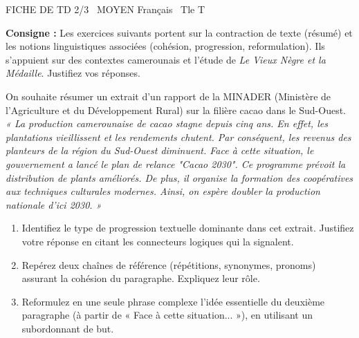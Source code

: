 \documentclass[11pt]{article}
\begin{document}
\begin{tcolorbox}[enhanced,colback=popink,colframe=popink,arc=10pt,boxrule=0pt,left=12pt,right=12pt,top=9pt,bottom=9pt]
{\color{white}\popxbold\small FICHE DE TD 2/3 \textbullet\ MOYEN \hfill Français \textbullet\ Tle T\par}
\end{tcolorbox}
\vspace{4pt}
\noindent\textbf{Consigne :} Les exercices suivants portent sur la contraction de texte (résumé) et les notions linguistiques associées (cohésion, progression, reformulation). Ils s'appuient sur des contextes camerounais et l'étude de \textit{Le Vieux Nègre et la Médaille}. Justifiez vos réponses.

\begin{exercice}
On souhaite résumer un extrait d'un rapport de la MINADER (Ministère de l'Agriculture et du Développement Rural) sur la filière cacao dans le Sud-Ouest.
\textit{« La production camerounaise de cacao stagne depuis cinq ans. En effet, les plantations vieillissent et les rendements chutent. Par conséquent, les revenus des planteurs de la région du Sud-Ouest diminuent. Face à cette situation, le gouvernement a lancé le plan de relance "Cacao 2030". Ce programme prévoit la distribution de plants améliorés. De plus, il organise la formation des coopératives aux techniques culturales modernes. Ainsi, on espère doubler la production nationale d'ici 2030. »}
\begin{enumerate}
    \item Identifiez le type de progression textuelle dominante dans cet extrait. Justifiez votre réponse en citant les connecteurs logiques qui la signalent.
    \item Repérez deux chaînes de référence (répétitions, synonymes, pronoms) assurant la cohésion du paragraphe. Expliquez leur rôle.
    \item Reformulez en une seule phrase complexe l'idée essentielle du deuxième paragraphe (à partir de « Face à cette situation... »), en utilisant un subordonnant de but.
\end{enumerate}
\end{exercice}
\end{document}
